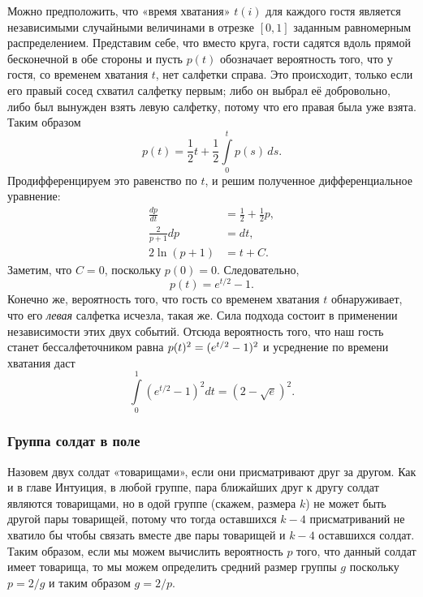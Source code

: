 Можно предположить, что «время хватания» $t(i)$ для каждого гостя является независимыми случайными величинами в отрезке $[0,1]$ заданным равномерным распределением.
Представим себе, что вместо круга, гости садятся вдоль прямой бесконечной в обе стороны и пусть $p(t)$ обозначает вероятность того, что у гостя, со временем хватания $t$, нет салфетки справа.
Это происходит, только если его правый сосед схватил салфетку первым;
либо он выбрал её добровольно,
либо был вынужден взять левую салфетку, потому что его правая была уже взята.
Таким образом
\[p(t)=\frac12t+\frac12\int\limits_0^tp(s)\,ds.\]
Продифференцируем это равенство по $t$, и решим полученное дифференциальное уравнение:
\begin{align*}
\frac{dp}{dt}&=\frac12+\frac12p,
\\
\frac2{p+1}dp&=dt,
\\
2\ln(p+1)&=t+C.
\end{align*}
Заметим, что $C=0$, поскольку $p(0)=0$.
Следовательно,
\[p(t) = e^{t/2} - 1.\]
Конечно же, вероятность того, что гость со временем хватания $t$ обнаруживает, что его \emph{левая} салфетка исчезла, такая же.
Сила подхода состоит в применении независимости этих двух событий.
Отсюда вероятность того, что наш гость станет бессалфеточником равна $p(t)^2 \z= (e^{t/2} -1)^2$ и усреднение по времени хватания даст
\[\int\limits_0^1(e^{t/2}-1)^2dt=(2-\sqrt{e})^2.\]
\heart

\subsubsection*{Группа солдат в поле}

Назовем двух солдат «товарищами», если они присматривают друг за другом.
Как и в главе Интуиция, в любой группе, пара ближайших друг к другу солдат являются товарищами, но в одой группе (скажем, размера $k$) не может быть другой пары товарищей, потому что тогда оставшихся $k-4$ присматриваний не хватило бы чтобы связать вместе две пары товарищей и $k-4$ оставшихся солдат.
Таким образом, если мы можем вычислить вероятность $p$ того, что данный солдат имеет товарища, то мы можем определить средний размер группы $g$ поскольку $p = 2/g$ и таким образом $g = 2/p$.

